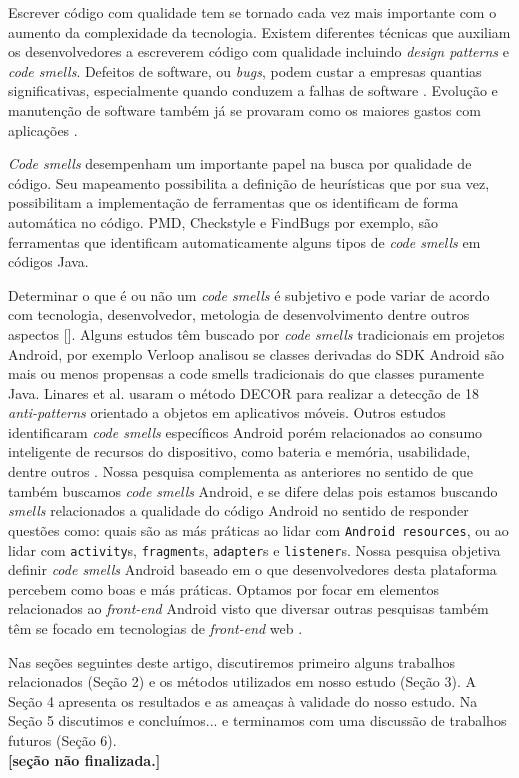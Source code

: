 Escrever c\'odigo com qualidade tem se tornado cada vez mais importante com o aumento da complexidade da tecnologia. Existem diferentes t\'ecnicas que auxiliam os desenvolvedores a escreverem c\'odigo com qualidade incluindo \textit{design patterns} e \textit{code smells}. Defeitos de software, ou \textit{bugs}, podem custar a empresas quantias significativas, especialmente quando conduzem a falhas de software \cite{Nagappan:2005, briand1993modeling}. Evolu\c{c}\~ao e manuten\c{c}\~ao de software tamb\'em j\'a se provaram como os maiores gastos com aplica\c{c}\~oes \cite{RefactoringAndImprovements:10}.

\textit{Code smells} desempenham um importante papel na busca por qualidade de c\'odigo. Seu mapeamento possibilita a defini\c{c}\~ao de heur\'isticas que por sua vez, possibilitam a implementa\c{c}\~ao de ferramentas que os identificam de forma autom\'atica no c\'odigo. PMD, Checkstyle e FindBugs por exemplo, s\~ao ferramentas que identificam automaticamente alguns tipos de \textit{code smells} em c\'odigos Java.

Determinar o que \'e ou n\~ao um \textit{code smells} \'e subjetivo e pode variar de acordo com tecnologia, desenvolvedor, metologia de desenvolvimento dentre outros aspectos []. Alguns estudos t\^em buscado por \textit{code smells} tradicionais em projetos Android, por exemplo Verloop \cite{MobileSmells:13} analisou se classes derivadas do SDK Android são mais ou menos propensas a code smells tradicionais do que classes puramente Java. Linares et al. \cite{DomainMatters} usaram o m\'etodo DECOR para realizar a detec\c{c}\~ao de 18 \textit{anti-patterns} orientado a objetos em aplicativos m\'oveis. Outros estudos identificaram \textit{code smells} espec\'ificos Android por\'em relacionados ao consumo inteligente de recursos do dispositivo, como bateria e mem\'oria, usabilidade, dentre outros \cite{EnergyAndroidSmells, ReimannBrylski2013}. Nossa pesquisa complementa as anteriores no sentido de que tamb\'em buscamos \textit{code smells} Android, e se difere delas pois estamos buscando \textit{smells} relacionados a qualidade do c\'odigo Android no sentido de responder quest\~oes como: quais s\~ao as m\'as pr\'aticas ao lidar com \texttt{Android resources}, ou ao lidar com \texttt{activity}s, \texttt{fragment}s, \texttt{adapter}s e \texttt{listener}s. Nossa pesquisa objetiva definir \textit{code smells} Android baseado em o que desenvolvedores desta plataforma percebem como boas e m\'as pr\'aticas. Optamos por focar em elementos relacionados ao \textit{front-end} Android visto que diversar outras pesquisas tamb\'em t\^em se focado em tecnologias de \textit{front-end} web \cite{CSSCodeSmell, BB}.

Nas se\c{c}\~oes seguintes deste artigo, discutiremos primeiro alguns trabalhos relacionados (Se\c{c}\~ao 2) e os m\'etodos utilizados em nosso estudo (Se\c{c}\~ao 3). A Se\c{c}\~ao 4 apresenta os resultados e as amea\c{c}as \`a validade do nosso estudo. Na Se\c{c}\~ao 5 discutimos e conclu\'imos... e terminamos com uma discuss\~ao de trabalhos futuros (Se\c{c}\~ao 6). \\

\textbf{[se\c{c}\~ao n\~ao finalizada.]}